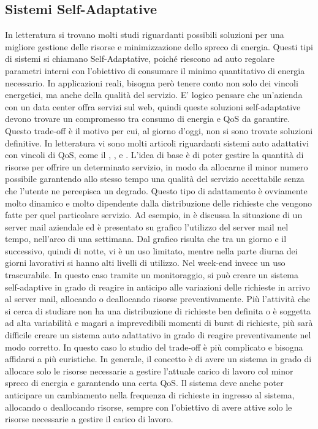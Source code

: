 \subsection{Sistemi Self-Adaptative}
In letteratura si trovano molti studi riguardanti possibili soluzioni per una migliore gestione delle risorse e minimizzazione dello spreco di energia. Questi tipi di sistemi si chiamano Self-Adaptative, poiché riescono ad auto regolare parametri interni con l'obiettivo di consumare il minimo quantitativo di energia necessario. In applicazioni reali, bisogna però tenere conto non solo dei vincoli energetici, ma anche della qualità del servizio. E’ logico pensare che un'azienda con un data center offra servizi sul web, quindi queste soluzioni self-adaptative devono trovare un compromesso tra consumo di energia e \acf{QoS} da garantire. Questo trade-off è il motivo per cui, al giorno d'oggi, non si sono trovate soluzioni definitive. In letteratura vi sono molti articoli riguardanti sistemi auto adattativi con vincoli di \acs{QoS}, come il \cite{PerezMirandolaMers2007-qosbw}, \cite{MarzollaMirandola2013-dpm}, \cite{PerezMirandolaMerseguer2014-relQoSandSWadapt} e \cite{PerezMirandolaMerseguer2014-QoSandPetriNets}. L’idea di base è di poter gestire la quantità di risorse per offrire un determinato servizio, in modo da allocarne il minor numero possibile garantendo allo stesso tempo una qualità del servizio accettabile senza che l’utente ne percepisca un degrado. Questo tipo di adattamento è ovviamente molto dinamico e molto dipendente dalla distribuzione delle richieste che vengono fatte per quel particolare servizio. Ad esempio, in \cite{PerezMirandolaMerseguer2014-QoSandPetriNets} è discussa la situazione di un server mail aziendale ed è presentato su grafico l'utilizzo del server mail nel tempo, nell'arco di una settimana. Dal grafico risulta che tra un giorno e il successivo, quindi di notte, vi è un uso limitato, mentre nella parte diurna dei giorni lavorativi si hanno alti livelli di utilizzo. Nel week-end invece un uso trascurabile. In questo caso tramite un monitoraggio, si può creare un sistema self-adaptive in grado di reagire in anticipo alle variazioni delle richieste in arrivo al server mail, allocando o deallocando risorse preventivamente. Più l'attività che si cerca di studiare non ha una distribuzione di richieste ben definita o è soggetta ad alta variabilità e magari a imprevedibili momenti di burst di richieste, più sarà difficile creare un sistema auto adattativo in grado di reagire preventivamente nel modo corretto. In questo caso lo studio del trade-off è più complicato e bisogna affidarsi a più euristiche. In generale, il concetto è di avere un sistema in grado di allocare solo le risorse necessarie a gestire l’attuale carico di lavoro col minor spreco di energia e garantendo una certa \acs{QoS}. Il sistema deve anche poter anticipare un cambiamento nella frequenza di richieste in ingresso al sistema, allocando o deallocando risorse, sempre con l’obiettivo di avere attive solo le risorse necessarie a gestire il carico di lavoro.


